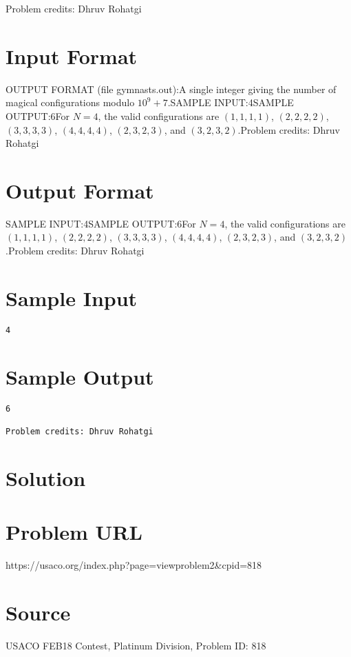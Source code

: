 \documentclass[12pt]{article}
\begin{document}
Problem credits: Dhruv Rohatgi



\section*{Input Format}
OUTPUT FORMAT (file gymnasts.out):A single integer giving the number of magical configurations modulo $10^9 + 7$.SAMPLE INPUT:4SAMPLE OUTPUT:6For $N = 4$, the valid configurations are $(1,1,1,1)$, $(2,2,2,2)$, $(3,3,3,3)$,
$(4,4,4,4)$, $(2,3,2,3)$, and $(3,2,3,2)$.Problem credits: Dhruv Rohatgi

\section*{Output Format}
SAMPLE INPUT:4SAMPLE OUTPUT:6For $N = 4$, the valid configurations are $(1,1,1,1)$, $(2,2,2,2)$, $(3,3,3,3)$,
$(4,4,4,4)$, $(2,3,2,3)$, and $(3,2,3,2)$.Problem credits: Dhruv Rohatgi

\section*{Sample Input}
\begin{verbatim}
4
\end{verbatim}

\section*{Sample Output}
\begin{verbatim}
6

Problem credits: Dhruv Rohatgi
\end{verbatim}

\section*{Solution}


\section*{Problem URL}
https://usaco.org/index.php?page=viewproblem2&cpid=818

\section*{Source}
USACO FEB18 Contest, Platinum Division, Problem ID: 818
\end{document}
